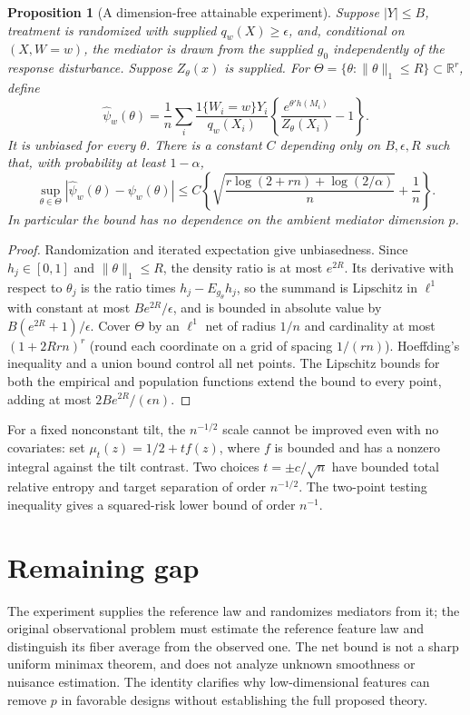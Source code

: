 \documentclass[11pt]{article}
\newtheorem{proposition}[theorem]{Proposition}
\theoremstyle{remark}
\begin{document}
\begin{proposition}[A dimension-free attainable experiment]
Suppose $|Y|\le B$, treatment is randomized with supplied $q_w(X)\ge\epsilon$, and, conditional on $(X,W=w)$, the mediator is drawn from the supplied $g_0$ independently of the response disturbance. Suppose $Z_\theta(x)$ is supplied. For $\Theta=\{\theta:\|\theta\|_1\le R\}\subset\mathbb R^r$, define
\[
 \widehat\psi_w(\theta)=\frac1n\sum_i\frac{1\{W_i=w\}Y_i}{q_w(X_i)}
 \left\{\frac{e^{\theta'h(M_i)}}{Z_\theta(X_i)}-1\right\}.
\]
It is unbiased for every $\theta$. There is a constant $C$ depending only on $B,\epsilon,R$ such that, with probability at least $1-\alpha$,
\[
 \sup_{\theta\in\Theta}|\widehat\psi_w(\theta)-\psi_w(\theta)|
 \le C\left\{\sqrt{\frac{r\log(2+rn)+\log(2/\alpha)}n}+\frac1n\right\}.
\]
In particular the bound has no dependence on the ambient mediator dimension $p$.
\end{proposition}
\begin{proof}
Randomization and iterated expectation give unbiasedness. Since $h_j\in[0,1]$ and $\|\theta\|_1\le R$, the density ratio is at most $e^{2R}$. Its derivative with respect to $\theta_j$ is the ratio times $h_j-E_{g_\theta}h_j$, so the summand is Lipschitz in $\ell^1$ with constant at most $Be^{2R}/\epsilon$, and is bounded in absolute value by $B(e^{2R}+1)/\epsilon$. Cover $\Theta$ by an $\ell^1$ net of radius $1/n$ and cardinality at most $(1+2Rrn)^r$ (round each coordinate on a grid of spacing $1/(rn)$). Hoeffding's inequality and a union bound control all net points. The Lipschitz bounds for both the empirical and population functions extend the bound to every point, adding at most $2Be^{2R}/(\epsilon n)$.
\end{proof}
For a fixed nonconstant tilt, the $n^{-1/2}$ scale cannot be improved even with no covariates: set $\mu_t(z)=1/2+t f(z)$, where $f$ is bounded and has a nonzero integral against the tilt contrast. Two choices $t=\pm c/\sqrt n$ have bounded total relative entropy and target separation of order $n^{-1/2}$. The two-point testing inequality gives a squared-risk lower bound of order $n^{-1}$.

\section*{Remaining gap}
The experiment supplies the reference law and randomizes mediators from it; the original observational problem must estimate the reference feature law and distinguish its fiber average from the observed one. The net bound is not a sharp uniform minimax theorem, and does not analyze unknown smoothness or nuisance estimation. The identity clarifies why low-dimensional features can remove $p$ in favorable designs without establishing the full proposed theory.
\end{document}
